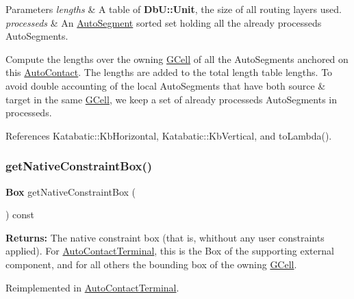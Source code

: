 \begin{DoxyParams}{Parameters}
{\em lengths} & A table of \textbf{ Db\+U\+::\+Unit}, the size of all routing layers used. \\
\hline
{\em processeds} & An \hyperlink{classKatabatic_1_1AutoSegment}{Auto\+Segment} sorted set holding all the already processeds Auto\+Segments.\\
\hline
\end{DoxyParams}
Compute the lengths over the owning \hyperlink{classKatabatic_1_1GCell}{G\+Cell} of all the Auto\+Segments anchored on this \hyperlink{classKatabatic_1_1AutoContact}{Auto\+Contact}. The lengths are added to the total length table {\ttfamily lengths}. To avoid double accounting of the local Auto\+Segments that have both source \& target in the same \hyperlink{classKatabatic_1_1GCell}{G\+Cell}, we keep a set of already processeds Auto\+Segments in {\ttfamily processeds}. 

References Katabatic\+::\+Kb\+Horizontal, Katabatic\+::\+Kb\+Vertical, and to\+Lambda().

\mbox{\label{classKatabatic_1_1AutoContact_a00ed934305dd186a284b7a13b5798cb6}} 
\subsubsection{\texorpdfstring{get\+Native\+Constraint\+Box()}{getNativeConstraintBox()}}
{\footnotesize\ttfamily \textbf{ Box} get\+Native\+Constraint\+Box (\begin{DoxyParamCaption}{ }\end{DoxyParamCaption}) const\hspace{0.3cm}{\ttfamily [virtual]}}

{\bfseries Returns\+:} The native constraint box (that is, whithout any user constraints applied). For \hyperlink{classKatabatic_1_1AutoContactTerminal}{Auto\+Contact\+Terminal}, this is the Box of the supporting external component, and for all others the bounding box of the owning \hyperlink{classKatabatic_1_1GCell}{G\+Cell}. 

Reimplemented in \hyperlink{classKatabatic_1_1AutoContactTerminal_a00ed934305dd186a284b7a13b5798cb6}{Auto\+Contact\+Terminal}.



